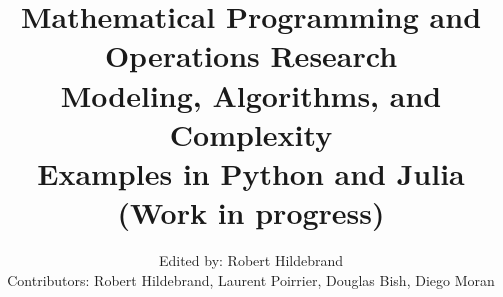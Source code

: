  \title{ \textbf{Mathematical Programming and\\ Operations Research}\\ Modeling, Algorithms, and Complexity\\
 Examples in Python and Julia\\
 (Work in progress)}
  \author{Edited by: Robert Hildebrand\\[1ex]
 Contributors:
 Robert Hildebrand, Laurent Poirrier, Douglas Bish, Diego Moran \\
  }

